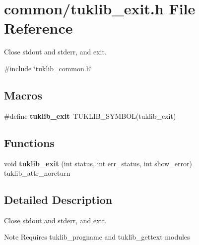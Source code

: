 \section{common/tuklib\+\_\+exit.h File Reference}
\label{tuklib__exit_8h}


Close stdout and stderr, and exit.  


{\ttfamily \#include \char`\"{}tuklib\+\_\+common.\+h\char`\"{}}\newline
\subsection*{Macros}
\begin{DoxyCompactItemize}
\item 
\mbox{\label{tuklib__exit_8h_a463463145398257c5a1a159d739c3688}} 
\#define {\bfseries tuklib\+\_\+exit}~T\+U\+K\+L\+I\+B\+\_\+\+S\+Y\+M\+B\+OL(tuklib\+\_\+exit)
\end{DoxyCompactItemize}
\subsection*{Functions}
\begin{DoxyCompactItemize}
\item 
\mbox{\label{tuklib__exit_8h_a811e4c214fc69f126517e2e0699c3b5b}} 
void {\bfseries tuklib\+\_\+exit} (int status, int err\+\_\+status, int show\+\_\+error) tuklib\+\_\+attr\+\_\+noreturn
\end{DoxyCompactItemize}


\subsection{Detailed Description}
Close stdout and stderr, and exit. 

\begin{DoxyNote}{Note}
Requires tuklib\+\_\+progname and tuklib\+\_\+gettext modules 
\end{DoxyNote}
